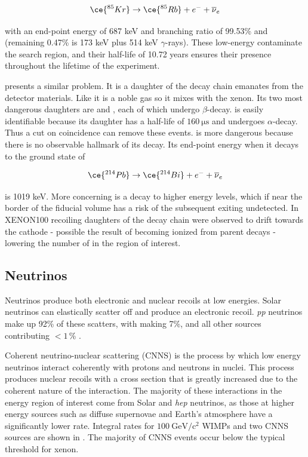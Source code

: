 \begin{equation}
\ce{^{85}Kr} \rightarrow \ce{^{85}Rb} + e^{-} + \overline{\nu}_e
\end{equation}

\noindent with an end-point energy of 687 keV and branching ratio of 99.53\% and (remaining 0.47\% is 173 keV plus 514 keV
$\gamma$-rays).  These low-energy \betadecays
contaminate the search region, and their half-life of 10.72 years ensures their presence throughout the lifetime of the experiment.

 presents a similar problem.  It is a daughter of the  decay chain emanates from the detector materials.  Like
 it is a noble gas so it mixes with the xenon.  Its two most dangerous daughters are \leadtwofourteen and , each
of which
undergo $\beta$-decay.   is easily identifiable because its daughter \poloniumtwofourteen has a half-life of
$160\ \mathrm{\mu s}$ and undergoes $\alpha$-decay.  Thus a cut on coincidence can remove these events.  \leadtwofourteen is more
dangerous because there is no observable hallmark of its decay.  Its end-point energy when it decays to the ground state of
\bismuthtwofourteen

\begin{equation}
\ce{^{214}Pb} \rightarrow \ce{^{214}Bi} + e^{-} + \overline{\nu}_e
\end{equation}

\noindent is 1019 keV.  More concerning is a decay to higher energy levels, which
if near the border of the fiducial volume has a risk of the subsequent \gammaray exiting undetected.  In XENON100 recoiling daughters of
the  decay chain were observed to drift towards the cathode - possible the result of becoming ionized from parent decays
 - lowering the number of \betadecays in the region of interest.


\subsection{Neutrinos}
\label{subsec:neutrinos}
Neutrinos produce both electronic and nuclear recoils at low energies.  Solar neutrinos can elastically scatter off \electron
and produce an electronic recoil.  \textit{pp} neutrinos make up 92\% of these scatters, with  making 7\%, and all other
sources contributing $< 1\, $\% .

Coherent neutrino-nuclear scattering (CNNS) is the process by which low energy neutrinos interact coherently with protons and neutrons in
nuclei.  This process produces nuclear recoils with a cross section that is greatly increased due to the coherent nature of the
interaction.  The majority of these interactions in the energy region of interest come from Solar 
and \textit{hep} neutrinos, as those at higher energy sources such as diffuse supernovae and Earth's atmosphere have a significantly
lower rate.  Integral rates for $100\ \mathrm{GeV/c^2}$ WIMPs and two CNNS sources are shown in
.  The majority of CNNS events occur below the typical threshold for xenon.

